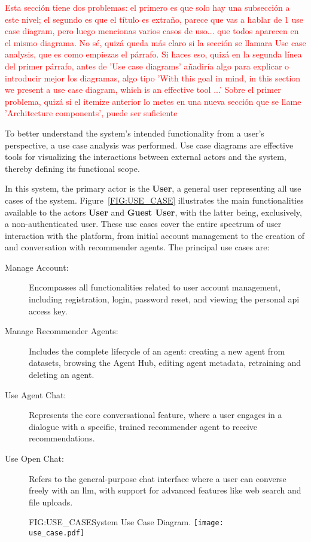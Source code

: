 \textcolor{red}{Esta sección tiene dos problemas: el primero es que solo hay una subsección a este nivel; el segundo es que el título es extraño, parece que vas a hablar de 1 use case diagram, pero luego mencionas varios casos de uso... que todos aparecen en el mismo diagrama. No sé, quizá queda más claro si la sección se llamara Use case analysis, que es como empiezas el párrafo. Si haces eso, quizá en la segunda línea del primer párrafo, antes de 'Use case diagrams' añadiría algo para explicar o introducir mejor los diagramas, algo tipo 'With this goal in mind, in this section we present a use case diagram, which is an effective tool ...'
Sobre el primer problema, quizá si el itemize anterior lo metes en una nueva sección que se llame 'Architecture components', puede ser suficiente}


To better understand the system's intended functionality from a user's perspective, a use case analysis was performed. Use case diagrams are effective tools for visualizing the interactions between external actors and the system, thereby defining its functional scope.

In this system, the primary actor is the \textbf{User}, a general user representing all use cases of the system. Figure~\ref{FIG:USE_CASE} illustrates the main functionalities available to the actors \textbf{User} and \textbf{Guest User}, with the latter being, exclusively, a non-authenticated user. These use cases cover the entire spectrum of user interaction with the platform, from initial account management to the creation of and conversation with recommender agents. The principal use cases are:

\begin{description}
    \item[Manage Account:] Encompasses all functionalities related to user account management, including registration, login, password reset, and viewing the personal \acs{api} access key.
    \item[Manage Recommender Agents:] Includes the complete lifecycle of an agent: creating a new agent from datasets, browsing the Agent Hub, editing agent metadata, retraining and deleting an agent.
    \item[Use Agent Chat:] Represents the core conversational feature, where a user engages in a dialogue with a specific, trained recommender agent to receive recommendations.
    \item[Use Open Chat:] Refers to the general-purpose chat interface where a user can converse freely with an \ac{llm}, with support for advanced features like web search and file uploads.
\end{description}

\begin{figure}[System Use Case Diagram]{FIG:USE_CASE}{System Use Case Diagram.}
    \centering
    \texttt{[image: use\_case.pdf]}
\end{figure}
